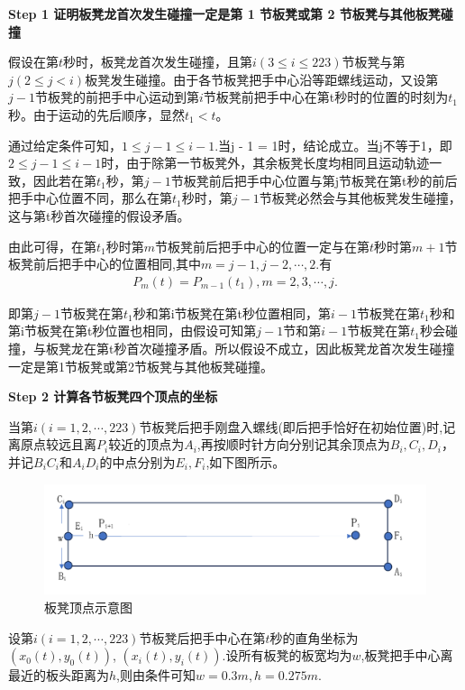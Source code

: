 \documentclass[../main.tex]{subfiles}
\begin{document}
  \noindent\textbf{Step 1 证明板凳龙首次发生碰撞一定是第 1 节板凳或第 2 节板凳与其他板凳碰撞}
  \par 假设在第$t$秒时，板凳龙首次发生碰撞，且第$i(3\leq i\leq 223)$节板凳与第$j(2\leq j<i)$板凳发生碰撞。由于各节板凳把手中心沿等距螺线运动，又设第$j-1$节板凳的前把手中心运动到第$i$节板凳前把手中心在第t秒时的位置的时刻为$t_1$秒。由于运动的先后顺序，显然$t_1<t$。
  \par 通过给定条件可知，$1\leq j-1\leq i-1$.当j - 1 = 1时，结论成立。当j不等于1，即$2\leq j-1\leq i-1$时，由于除第一节板凳外，其余板凳长度均相同且运动轨迹一致，因此若在第$t_{1}$秒，第$j - 1$节板凳前后把手中心位置与第j节板凳在第t秒的前后把手中心位置不同，那么在第$t_{1}$秒时，第$j - 1$节板凳必然会与其他板凳发生碰撞，这与第t秒首次碰撞的假设矛盾。
  \par 由此可得，在第$t_1$秒时第$m$节板凳前后把手中心的位置一定与在第$t$秒时第$m+1$节板凳前后把手中心的位置相同,其中$m=j-1,j-2,\cdots,2$.有
  \begin{align}\label{1.........18}
  P_m\left( t \right) =P_{m-1}\left( t_1 \right) ,m=2,3,\cdots ,j.
  \end{align}
  \par 即第$j - 1$节板凳在第$t_{1}$秒和第i节板凳在第t秒位置相同，第$i - 1$节板凳在第$t_{1}$秒和第i节板凳在第t秒位置也相同，由假设可知第$j - 1$节和第$i - 1$节板凳在第$t_{1}$秒会碰撞，与板凳龙在第t秒首次碰撞矛盾。所以假设不成立，因此板凳龙首次发生碰撞一定是第1节板凳或第2节板凳与其他板凳碰撞。
 
  \noindent\textbf{Step 2 计算各节板凳四个顶点的坐标}
  \par 当第$i(i=1,2,\cdots,223)$节板凳后把手刚盘入螺线(即后把手恰好在初始位置)时,记离原点较远且离$P_i$较近的顶点为$A_i$,再按顺时针方向分别记其余顶点为$B_i,C_i,D_i$，并记$B_iC_i$和$A_iD_i$的中点分别为$E_i,F_i$,如下图所示。
  \begin{figure}[H]
     \centering
     \includegraphics[width=.6\textwidth]{tupian}
     \caption{板凳顶点示意图}
     \label{fig:circuit-diagram}
 \end{figure}
 \par 设第$i(i=1,2,\cdots,223)$节板凳后把手中心在第$t$秒的直角坐标为$(x_0(t),y_0(t))$,
 $(x_i(t),y_i(t))$.设所有板凳的板宽均为$w$,板凳把手中心离最近的板头距离为$h$,则由条件可知$w=0.3m,h=0.275m$.
 
\end{document}
